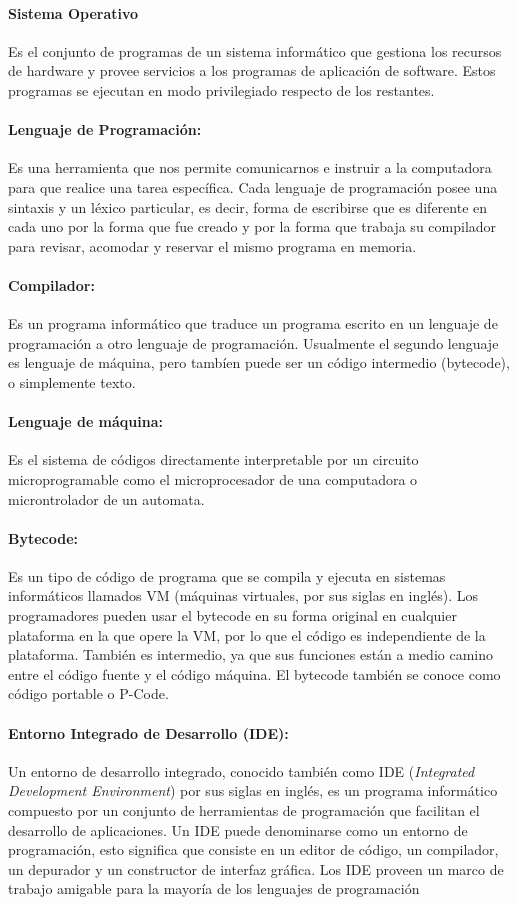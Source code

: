 \paragraph{Sistema Operativo} Es el conjunto de programas de un sistema informático que gestiona los recursos de hardware y provee servicios a los programas de aplicación de software. Estos programas se ejecutan en modo privilegiado respecto de los restantes.

\paragraph{Lenguaje de Programación:} Es una herramienta
que nos permite comunicarnos e instruir a la computadora para que realice una tarea específica. Cada
lenguaje de programación posee una sintaxis y un léxico particular, es decir, forma de escribirse que
es diferente en cada uno por la forma que fue creado y por la forma que trabaja su compilador para
revisar, acomodar y reservar el mismo programa en memoria.

\paragraph{Compilador:} Es un programa informático que traduce un programa escrito en un lenguaje de programación a otro lenguaje de programación. Usualmente el segundo lenguaje es lenguaje de máquina, pero tambíen puede ser un código intermedio (bytecode), o simplemente texto.

\paragraph{Lenguaje de máquina:} Es el sistema de códigos directamente interpretable por un circuito microprogramable como el microprocesador de una computadora o microntrolador de un automata.

\paragraph{Bytecode:} Es un tipo de código de programa que se compila y ejecuta en sistemas informáticos llamados VM (máquinas virtuales, por sus siglas en inglés). Los programadores pueden usar el bytecode en su forma original en cualquier plataforma en la que opere la VM, por lo que el código es independiente de la plataforma. También es intermedio, ya que sus funciones están a medio camino entre el código fuente y el código máquina. El bytecode también se conoce como código portable o P-Code.

\paragraph{Entorno Integrado de Desarrollo (IDE):} Un entorno de desarrollo integrado, conocido también como IDE (\emph{Integrated Development
	Environment}) por sus siglas en inglés, es un programa informático compuesto por un conjunto de herramientas de programación que facilitan el desarrollo de aplicaciones. Un IDE
puede denominarse como un entorno de programación, esto significa que consiste en un
editor de código, un compilador, un depurador y un constructor de interfaz gráfica. Los
IDE proveen un marco de trabajo amigable para la mayoría de los lenguajes de programación